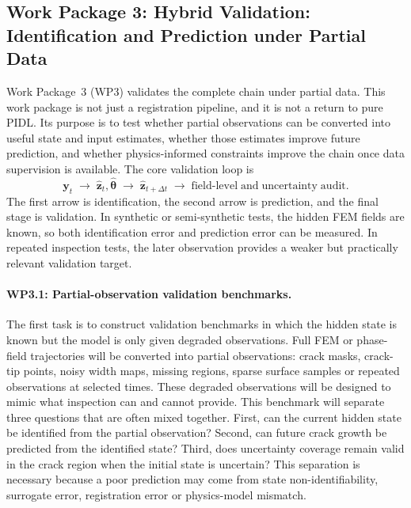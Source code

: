 \subsection[Work Package 3: Hybrid Validation under Partial Data]{Work Package 3: Hybrid Validation: Identification and Prediction under Partial Data}

Work Package~3 (WP3) validates the complete chain under partial data.
This work package is not just a registration pipeline, and it is not a return to pure PIDL.
Its purpose is to test whether partial observations can be converted into useful state and input estimates, whether those estimates improve future prediction, and whether physics-informed constraints improve the chain once data supervision is available.
The core validation loop is
\[
    \mathbf{y}_t \;\rightarrow\; \hat{\mathbf{z}}_t,\hat{\boldsymbol{\theta}} \;\rightarrow\; \hat{\mathbf{z}}_{t+\Delta t} \;\rightarrow\; \mathrm{field\mbox{-}level\;and\;uncertainty\;audit}.
\]
The first arrow is identification, the second arrow is prediction, and the final stage is validation.
In synthetic or semi-synthetic tests, the hidden FEM fields are known, so both identification error and prediction error can be measured.
In repeated inspection tests, the later observation provides a weaker but practically relevant validation target.

\paragraph{WP3.1: Partial-observation validation benchmarks.}
The first task is to construct validation benchmarks in which the hidden state is known but the model is only given degraded observations.
Full FEM or phase-field trajectories will be converted into partial observations: crack masks, crack-tip points, noisy width maps, missing regions, sparse surface samples or repeated observations at selected times.
These degraded observations will be designed to mimic what inspection can and cannot provide.
This benchmark will separate three questions that are often mixed together.
First, can the current hidden state be identified from the partial observation?
Second, can future crack growth be predicted from the identified state?
Third, does uncertainty coverage remain valid in the crack region when the initial state is uncertain?
This separation is necessary because a poor prediction may come from state non-identifiability, surrogate error, registration error or physics-model mismatch.

